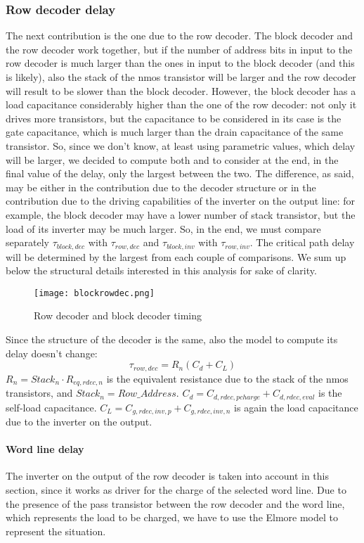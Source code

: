 \subsubsection{Row decoder delay}
The next contribution is the one due to the row decoder. The block decoder and the row decoder work together, but if the number of address bits in input to the row decoder is much larger than the ones in input to the block decoder (and this is likely), also the stack of the nmos transistor will be larger and the row decoder will result to be slower than the block decoder. However, the block decoder has a load capacitance considerably higher than the one of the row decoder: not only it drives more transistors, but the capacitance to be considered in its case is the gate capacitance, which is much larger than the drain capacitance of the same transistor. So, since we don't know, at least using parametric values, which delay will be larger, we decided to compute both and to consider at the end, in the final value of the delay, only the largest between the two. The difference, as said, may be either in the contribution due to the decoder structure or in the contribution due to the driving capabilities of the inverter on the output line: for example, the block decoder may have a lower number of stack transistor, but the load of its inverter may be much larger. So, in the end, we must compare separately $\tau_{block,dec}$ with $\tau_{row,dec}$ and $\tau_{block,inv}$ with $\tau_{row,inv}$. The critical path delay will be determined by the largest from each couple of comparisons. We sum up below the structural details interested in this analysis for sake of clarity.

\begin{center}
	\begin{figure}[H]
		\centering
		\texttt{[image: blockrowdec.png]}
		\caption{Row decoder and block decoder timing}
	\end{figure}
\end{center}

Since the structure of the decoder is the same, also the model to compute its delay doesn't change:
$$\tau_{row,dec}=R_n(C_d+C_L)$$
$R_n=Stack_n\cdot R_{eq,rdec,n}$ is the equivalent resistance due to the stack of the nmos transistors, and $Stack_n=Row\_Address$. $C_d=C_{d,rdec,pcharge}+C_{d,rdec,eval}$ is the self-load capacitance. $C_L=C_{g,rdec,inv,p}+C_{g,rdec,inv,n}$ is again the load capacitance due to the inverter on the output.

\paragraph{Word line delay}
The inverter on the output of the row decoder is taken into account in this section, since it works as driver for the charge of the selected word line. Due to the presence of the pass transistor between the row decoder and the word line, which represents the load to be charged, we have to use the Elmore model to represent the situation.

